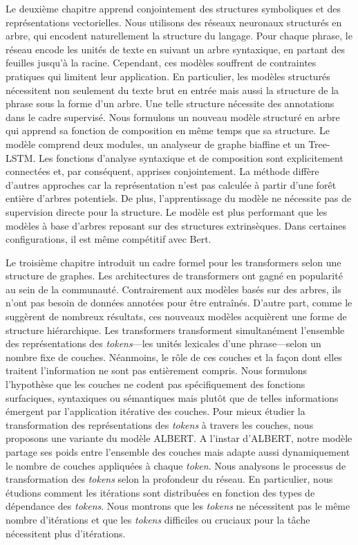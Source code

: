 Le deuxième chapitre apprend conjointement des structures symboliques et des représentations vectorielles. Nous utilisons des réseaux neuronaux structurés en arbre, qui encodent naturellement la structure du langage. Pour chaque phrase, le réseau encode les unités de texte en suivant un arbre syntaxique, en partant des feuilles jusqu'à la racine. Cependant, ces modèles souffrent de contraintes pratiques qui limitent leur application. En particulier, les modèles structurés nécessitent non seulement du texte brut en entrée mais aussi la structure de la phrase sous la forme d'un arbre. Une telle structure nécessite des annotations dans le cadre supervisé. Nous formulons un nouveau modèle structuré en arbre qui apprend sa fonction de composition en même temps que sa structure. Le modèle comprend deux modules, un analyseur de graphe biaffine et un Tree-LSTM. Les fonctions d'analyse syntaxique et de composition sont explicitement connectées et, par conséquent, apprises conjointement. La méthode diffère d’autres approches car la représentation n'est pas calculée à partir d’une forêt entière d'arbres potentiels. De plus, l'apprentissage du modèle ne nécessite pas de supervision directe pour la structure. Le modèle est plus performant que les modèles à base d'arbres reposant sur des structures extrinsèques. Dans certaines configurations, il est même compétitif avec Bert.

Le troisième chapitre introduit un cadre formel pour les transformers selon une structure de graphes. Les architectures de transformers ont gagné en popularité au sein de la communauté. Contrairement aux modèles basés sur des arbres, ils n'ont pas besoin de données annotées pour être entraînés. D'autre part, comme le suggèrent de nombreux résultats, ces nouveaux modèles acquièrent une forme de structure hiérarchique. Les transformers transforment simultanément l’ensemble des représentations des \textit{tokens}—les unités lexicales d’une phrase—selon un nombre fixe de couches. Néanmoins, le rôle de ces couches et la façon dont elles traitent l'information ne sont pas entièrement compris. Nous formulons l'hypothèse que les couches ne codent pas spécifiquement des fonctions surfaciques, syntaxiques ou sémantiques mais plutôt que de telles informations émergent par l'application itérative des couches. Pour mieux étudier la transformation des représentations des \textit{tokens} à travers les couches, nous proposons une variante du modèle ALBERT. A l’instar d’ALBERT, notre modèle partage ses poids entre l’ensemble des couches mais adapte aussi dynamiquement le nombre de couches appliquées à chaque \textit{token}. Nous analysons le processus de transformation des \textit{tokens} selon la profondeur du réseau. En particulier, nous étudions comment les itérations sont distribuées en fonction des types de dépendance des \textit{tokens}. Nous montrons que les \textit{tokens} ne nécessitent pas le même nombre d'itérations et que les \textit{tokens} difficiles ou cruciaux pour la tâche nécessitent plus d'itérations.

